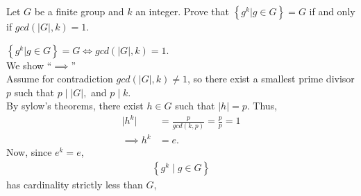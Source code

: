 \documentclass{article}
\begin{document}
\begin{homeworkProblem}
     Let $G$ be a finite group and 
     $k$ an integer. 
     Prove that $\left\{ g^k | g \in G \right\} = G$
     if and only if $gcd \left( \lvert G \rvert, k \right) = 1$.\\
 
     \solution
 
     $\left\{ g^k | g \in G \right\} = G \iff gcd( \lvert G \rvert, k ) = 1$.\\
     We show ``$\implies$''\\
     Assume for contradiction $gcd ( \lvert G \rvert, k) \neq 1$,
     so there exist a smallest prime divisor $p$ 
     such that $p \mid \lvert G \rvert,$ and $p \mid k$.\\
     By sylow's theorems, there exist $h \in G$ such that
     $\lvert h \rvert = p$. Thus,\\
     \begin{align}
         \lvert h^k \rvert &= \frac{ p }{ gcd(k,p) } = \frac{ p }{ p } = 1\\
         \implies h^k &= e.
     \end{align}
     Now, since $e^k = e$,
     \begin{align}
         \left\{ g^k \mid g \in G \right\}
     \end{align}
     has cardinality strictly less than $G$,
     
    


    
\end{homeworkProblem}

\pagebreak
\end{document}
